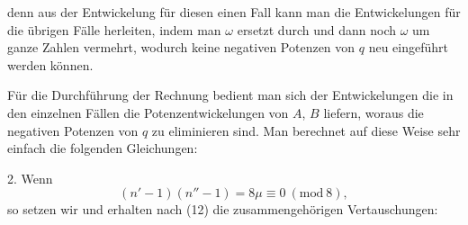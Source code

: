 denn aus der Entwickelung für diesen einen Fall kann man die
Entwickelungen für die übrigen Fälle herleiten, indem man $\omega$
ersetzt durch
und dann noch $\omega$ um ganze Zahlen vermehrt, wodurch keine negativen
Potenzen von $q$ neu eingeführt werden können.

Für die Durchführung der Rechnung bedient man sich der Entwickelungen
die in den einzelnen Fällen die Potenzentwickelungen von $A$, $B$
liefern, woraus die negativen Potenzen von $q$ zu eliminieren sind. Man
berechnet auf diese Weise sehr einfach die folgenden Gleichungen:

2. Wenn
\[
(n'-1)(n''-1) = 8\mu \equiv 0 \ (\mathrm{mod}\ 8),
\]
so setzen wir
und erhalten nach (12) die zusammengehörigen Vertauschungen:
